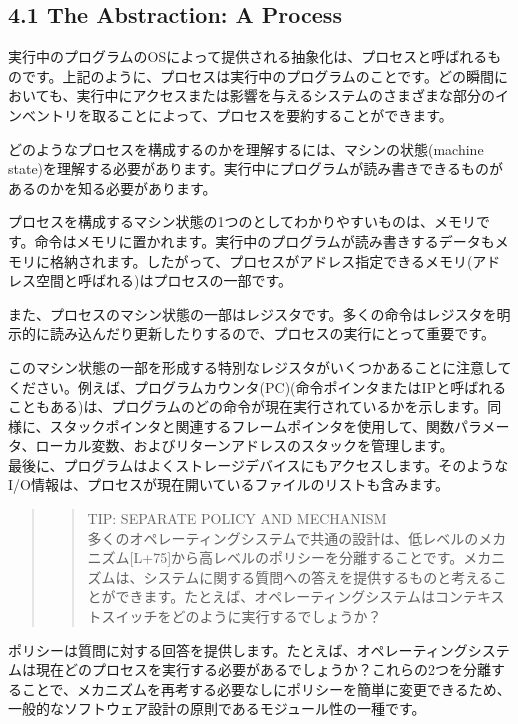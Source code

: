 \hypertarget{the-abstraction-a-process}{%
\subsection*{4.1 The Abstraction: A
Process}\label{the-abstraction-a-process}}

実行中のプログラムのOSによって提供される抽象化は、プロセスと呼ばれるものです。上記のように、プロセスは実行中のプログラムのことです。どの瞬間においても、実行中にアクセスまたは影響を与えるシステムのさまざまな部分のインベントリを取ることによって、プロセスを要約することができます。

どのようなプロセスを構成するのかを理解するには、マシンの状態(machine
state)を理解する必要があります。実行中にプログラムが読み書きできるものがあるのかを知る必要があります。

プロセスを構成するマシン状態の1つのとしてわかりやすいものは、メモリです。命令はメモリに置かれます。実行中のプログラムが読み書きするデータもメモリに格納されます。したがって、プロセスがアドレス指定できるメモリ(アドレス空間と呼ばれる)はプロセスの一部です。

また、プロセスのマシン状態の一部はレジスタです。多くの命令はレジスタを明示的に読み込んだり更新したりするので、プロセスの実行にとって重要です。

このマシン状態の一部を形成する特別なレジスタがいくつかあることに注意してください。例えば、プログラムカウンタ(PC)(命令ポインタまたはIPと呼ばれることもある)は、プログラムのどの命令が現在実行されているかを示します。同様に、スタックポインタと関連するフレームポインタを使用して、関数パラメータ、ローカル変数、およびリターンアドレスのスタックを管理します。\\
最後に、プログラムはよくストレージデバイスにもアクセスします。そのようなI/O情報は、プロセスが現在開いているファイルのリストも含みます。

\begin{quote}
\begin{quote}
TIP: SEPARATE POLICY AND MECHANISM\\
多くのオペレーティングシステムで共通の設計は、低レベルのメカニズム{[}L+75{]}から高レベルのポリシーを分離することです。メカニズムは、システムに関する質問への答えを提供するものと考えることができます。たとえば、オペレーティングシステムはコンテキストスイッチをどのように実行するでしょうか？
\end{quote}
\end{quote}

ポリシーは質問に対する回答を提供します。たとえば、オペレーティングシステムは現在どのプロセスを実行する必要があるでしょうか？これらの2つを分離することで、メカニズムを再考する必要なしにポリシーを簡単に変更できるため、一般的なソフトウェア設計の原則であるモジュール性の一種です。

